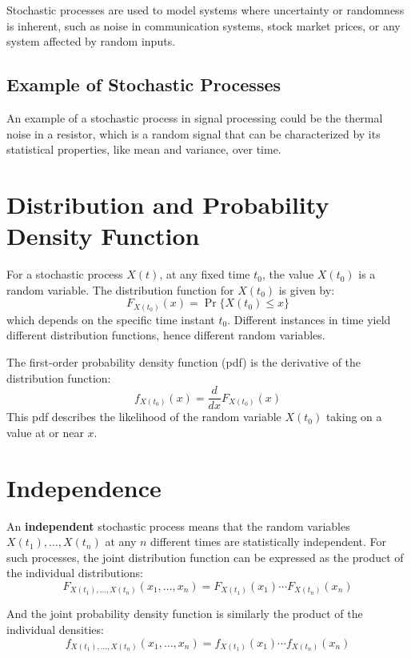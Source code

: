 Stochastic processes are used to model systems where uncertainty or randomness is inherent, such as noise in communication systems, stock market prices, or any system affected by random inputs.

\subsection*{Example of Stochastic Processes}
An example of a stochastic process in signal processing could be the thermal noise in a resistor, which is a random signal that can be characterized by its statistical properties, like mean and variance, over time.

\section*{Distribution and Probability Density Function}

For a stochastic process \( X(t) \), at any fixed time \( t_0 \), the value \( X(t_0) \) is a random variable. The distribution function for \( X(t_0) \) is given by:
\[ F_{X(t_0)}(x) = \Pr\{X(t_0) \leq x\} \]
which depends on the specific time instant \( t_0 \). Different instances in time yield different distribution functions, hence different random variables.

The first-order probability density function (pdf) is the derivative of the distribution function:
\[ f_{X(t_0)}(x) = \frac{d}{dx}F_{X(t_0)}(x) \]
This pdf describes the likelihood of the random variable \( X(t_0) \) taking on a value at or near \( x \).

\section*{Independence}

An \textbf{independent} stochastic process means that the random variables \( X(t_1), \ldots, X(t_n) \) at any \( n \) different times are statistically independent. For such processes, the joint distribution function can be expressed as the product of the individual distributions:
\[ F_{X(t_1),\ldots,X(t_n)}(x_1, \ldots, x_n) = F_{X(t_1)}(x_1) \cdots F_{X(t_n)}(x_n) \]

And the joint probability density function is similarly the product of the individual densities:
\[ f_{X(t_1),\ldots,X(t_n)}(x_1, \ldots, x_n) = f_{X(t_1)}(x_1) \cdots f_{X(t_n)}(x_n) \]

